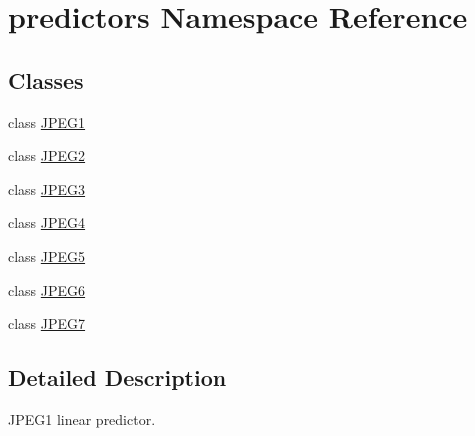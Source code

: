 \hypertarget{namespacepredictors}{}\section{predictors Namespace Reference}
\label{namespacepredictors}
\subsection*{Classes}
\begin{DoxyCompactItemize}
\item 
class \hyperlink{classpredictors_1_1JPEG1}{J\+P\+E\+G1}
\item 
class \hyperlink{classpredictors_1_1JPEG2}{J\+P\+E\+G2}
\item 
class \hyperlink{classpredictors_1_1JPEG3}{J\+P\+E\+G3}
\item 
class \hyperlink{classpredictors_1_1JPEG4}{J\+P\+E\+G4}
\item 
class \hyperlink{classpredictors_1_1JPEG5}{J\+P\+E\+G5}
\item 
class \hyperlink{classpredictors_1_1JPEG6}{J\+P\+E\+G6}
\item 
class \hyperlink{classpredictors_1_1JPEG7}{J\+P\+E\+G7}
\end{DoxyCompactItemize}


\subsection{Detailed Description}
\begin{DoxyVerb}JPEG1 linear predictor.
\end{DoxyVerb}
 